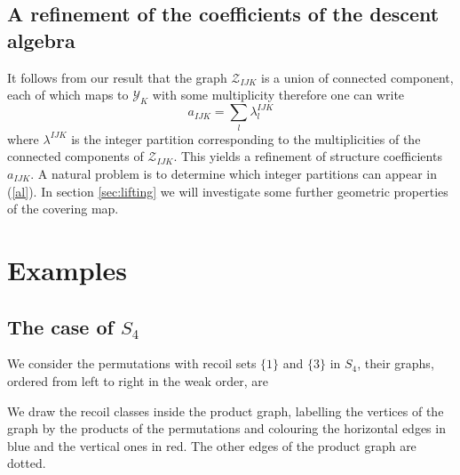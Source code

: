 \documentclass[11pt,a4paper]{amsart}
\theoremstyle{contraction}
\begin{document}
\subsection{A refinement of the coefficients of the descent algebra}
It follows from our result that the graph ${\mathcal Z}_{IJK}$ is a union of connected component, each of which maps to 
${\mathcal Y}_{K}$ with some multiplicity therefore one can write 
\begin{equation}\label{al}
a_{IJK}=\sum_l\lambda^{IJK}_l
\end{equation}
 where $\lambda^{IJK}$ is the integer partition corresponding to the multiplicities of the connected components of ${\mathcal Z}_{IJK}$. This yields a refinement of structure coefficients $a_{IJK}$. A natural problem is to determine which integer partitions can appear in (\ref{al}). In section \ref{sec:lifting}
 we will investigate some further geometric properties of the covering map.
 
\section{Examples}\label{sec:examples}
\subsection{The case of $S_4$}


We consider the permutations with recoil sets $\{1\}$ and $\{3\}$ in $S_4$, their graphs, ordered from left to right in the weak order, are

\bigskip


\begin{center}
\end{center}


\bigskip


We draw the recoil classes inside the product graph, labelling the vertices of the graph by the products of the permutations and colouring the horizontal edges  in blue and the vertical ones in red.
The other edges of the product graph are dotted.
\end{document}

